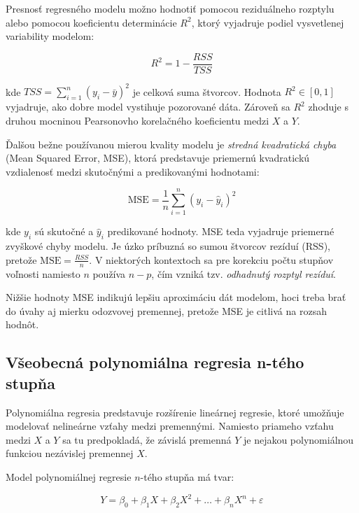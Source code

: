 Presnosť regresného modelu možno hodnotiť pomocou reziduálneho rozptylu alebo pomocou koeficientu determinácie $R^2$, ktorý vyjadruje podiel vysvetlenej variability modelom:

\begin{equation}
R^2 = 1 - \frac{RSS}{TSS}
\end{equation}

kde $TSS = \sum_{i=1}^{n}(y_i - \bar{y})^2$ je celková suma štvorcov. Hodnota $R^2 \in [0, 1]$ vyjadruje, ako dobre model vystihuje pozorované dáta. Zároveň sa $R^2$ zhoduje s druhou mocninou Pearsonovho korelačného koeficientu medzi $X$ a $Y$.

Ďalšou bežne používanou mierou kvality modelu je \textit{stredná kvadratická chyba} (Mean Squared Error, MSE), ktorá predstavuje priemernú kvadratickú vzdialenosť medzi skutočnými a predikovanými hodnotami:

\begin{equation}
\mathrm{MSE} = \frac{1}{n} \sum_{i=1}^{n} (y_i - \hat{y}_i)^2
\end{equation}

kde $y_i$ sú skutočné a $\hat{y}_i$ predikované hodnoty. MSE teda vyjadruje priemerné zvyškové chyby modelu. Je úzko príbuzná so sumou štvorcov rezíduí (RSS), pretože $\mathrm{MSE} = \frac{RSS}{n}$. V niektorých kontextoch sa pre korekciu počtu stupňov voľnosti namiesto $n$ používa $n - p$, čím vzniká tzv. \textit{odhadnutý rozptyl rezíduí}.

Nižšie hodnoty MSE indikujú lepšiu aproximáciu dát modelom, hoci treba brať do úvahy aj mierku odozvovej premennej, pretože MSE je citlivá na rozsah hodnôt.

\subsection{Všeobecná polynomiálna regresia n-tého stupňa}
\label{subsec:polynomial_regression}

Polynomiálna regresia predstavuje rozšírenie lineárnej regresie, ktoré umožňuje modelovať nelineárne vzťahy medzi premennými. Namiesto priameho vzťahu medzi $X$ a $Y$ sa tu predpokladá, že závislá premenná $Y$ je nejakou polynomiálnou funkciou nezávislej premennej $X$.

Model polynomiálnej regresie $n$-tého stupňa má tvar:

\begin{equation}
Y = \beta_0 + \beta_1 X + \beta_2 X^2 + \dots + \beta_n X^n + \varepsilon
\end{equation}

